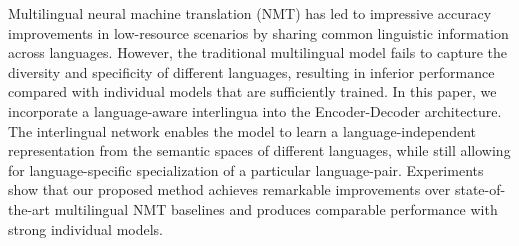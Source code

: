 Multilingual neural machine translation (NMT) has led to impressive accuracy improvements in low-resource scenarios by sharing common linguistic information across languages. However, the traditional multilingual model fails to capture the diversity and specificity of different languages, resulting in inferior performance compared with individual models that are sufficiently trained. In this paper, we incorporate a language-aware interlingua into the Encoder-Decoder architecture. The interlingual network enables the model to learn a language-independent representation from the semantic spaces of different languages, while still allowing for language-specific specialization of a particular language-pair. Experiments show that our proposed method achieves remarkable improvements over state-of-the-art multilingual NMT baselines and produces comparable performance with strong individual models.
